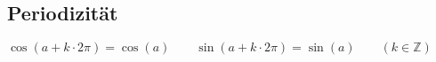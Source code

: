 \subsection{Periodizität}
	$\cos(a+k\cdot2\pi)=\cos(a) \qquad \sin(a+k\cdot2\pi)=\sin(a) \qquad
	(k \in \mathbb{Z})$